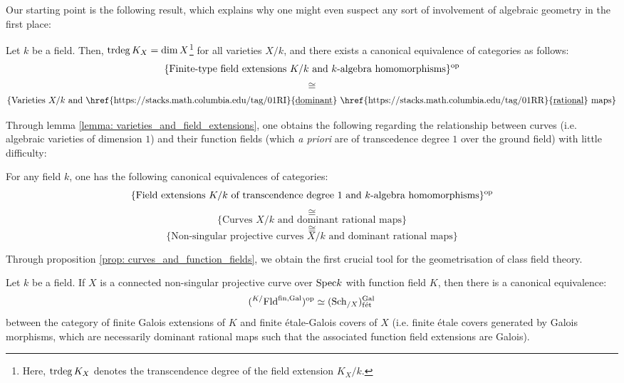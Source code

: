             Our starting point is the following result, which explains why one might even suspect any sort of involvement of algebraic geometry in the first place:
            \begin{lemma} \label{lemma: varieties_and_field_extensions}
                \cite[\href{https://stacks.math.columbia.edu/tag/0BXN}{Tag 0BXN}]{stacks} Let $k$ be a field. Then, $\operatorname{trdeg} K_X = \dim X$\footnote{Here, $\operatorname{trdeg} K_X$ denotes the transcendence degree of the field extension $K_X/k$.} for all varieties $X/k$, and there exists a canonical equivalence of categories as follows:
                    $$\{\text{Finite-type field extensions $K/k$ and $k$-algebra homomorphisms}\}^{\mathrm{op}}$$
                    $$\cong$$
                    $$\{\text{Varieties $X/k$ and \href{https://stacks.math.columbia.edu/tag/01RI}{\underline{dominant}} \href{https://stacks.math.columbia.edu/tag/01RR}{\underline{rational}} maps}\}$$
            \end{lemma}
            Through lemma \ref{lemma: varieties_and_field_extensions}, one obtains the following regarding the relationship between curves (i.e. algebraic varieties of dimension $1$) and their function fields (which \textit{a priori} are of transcedence degree $1$ over the ground field) with little difficulty:
            \begin{proposition} \label{prop: curves_and_function_fields}
                \cite[\href{https://stacks.math.columbia.edu/tag/0BY1}{Tag 0BY1}]{stacks} For any field $k$, one has the following canonical equivalences of categories:
                    $$\{\text{Field extensions $K/k$ of transcendence degree $1$ and $k$-algebra homomorphisms}\}^{\mathrm{op}}$$
                    $$\cong$$
                    $$\{\text{Curves $X/k$ and dominant rational maps}\}$$
                    $$\cong$$
                    $$\{\text{Non-singular projective curves $X/k$ and dominant rational maps}\}$$
            \end{proposition}
            Through proposition \ref{prop: curves_and_function_fields}, we obtain the first crucial tool for the geometrisation of class field theory.
            \begin{corollary} \label{coro: galois_covers_of_curves_and_galois_extensions}
                Let $k$ be a field. If $X$ is a connected non-singular projective curve over $\mathrm{Spec} k$ with function field $K$, then there is a canonical equivalence:
                    $$({}^{K/}\mathrm{Fld}^{\mathrm{fin}, \mathrm{Gal}})^{\mathrm{op}} \simeq (\mathrm{Sch}_{/X})_{\mathrm{f\acute{e}t}}^{\mathrm{Gal}}$$
                between the category of finite Galois extensions of $K$ and finite \'etale-Galois covers of $X$ (i.e. finite \'etale covers generated by Galois morphisms, which are necessarily dominant rational maps such that the associated function field extensions are Galois). 
            \end{corollary}
